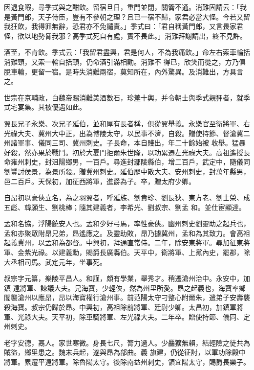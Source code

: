\begin{pinyinscope}
 因退食暇，尋季式與之酣飲。留宿旦日，重門並閉，關籥不通。消難固請云：「我是黃門郎，天子侍臣，豈有不參朝之理？且已一宿不歸，家君必當大怪。今若又留我狂飲，我得罪無辭，恐君亦不免譴責。」季式曰：「君自稱黃門郎，又言畏家君怪，欲以地勢脅我邪？高季式死自有處，實不畏此。」消難拜謝請出，終不見許。



 酒至，不肯飲。季式云：「我留君盡興，君是何人，不為我痛飲。」命左右索車輪括消難頸，又索一輪自括頸，仍命酒引滿相勸。消難不
 得已，欣笑而從之，方乃俱脫車輪，更留一宿。是時失消難兩宿，莫知所在，內外驚異。及消難出，方具言之。



 世宗在京輔政，白魏帝賜消難美酒數石，珍羞十輿，并令朝士與季式親狎者，就季式宅宴集。其被優遇如此。



 翼長兄子永樂、次兄子延伯，並和厚有長者稱，俱從翼舉義。永樂官至衛將軍、右光祿大夫、冀州大中正，出為博陵太守，以民事不濟，自殺。贈使持節、督滄冀二州諸軍事、儀同三司、冀州刺史。子長命，本自賤出，年二十餘始被
 收舉。猛暴好殺，然亦果於戰鬥。初於大夏門拒爾朱世隆，以功累遷左光祿大夫。高祖遙授長命雍州刺史，封沮陽鄉男，一百戶。尋進封鄢陵縣伯，增二百戶，武定中，隨儀同劉豐討侯景，為景所殺。贈冀州刺史。延伯歷中散大夫、安州刺史，封萬年縣男，邑二百戶。天保初，加征西將軍，進爵為子。卒，贈太府少卿。



 自昂初以豪俠立名，為之羽翼者，呼延族、劉貴珍、劉長狄、東方老、劉士榮、成五彪、韓願生、劉桃棒；隨其建義者，李希光、劉叔宗、劉孟
 和。並仕宦顯達。



 孟和名協，浮陽饒安人也。孟和少好弓馬，率性豪俠。幽州刺史劉靈助之起兵也，孟和亦聚眾附昂兄弟，昂遙應之。及靈助敗，昂乃據冀州，孟和為其致力。會高祖起義冀州，以孟和為都督。中興初，拜通直常侍。二年，除安東將軍。尋加征東將軍、金紫光祿。以建義勳，賜爵長廣縣伯。天平中，衛將軍、上黨內史，罷郡，除大丞相司馬。武定元年，坐事死。



 叔宗字元纂，樂陵平昌人。和謹，頗有學業，舉秀才。稍遷滄州治中。永安中，加鎮
 遠將軍、諫議大夫。兄海寶，少輕俠，然為州里所愛。昂之起義也，海寶率鄉閭襲滄州以應昂，昂以海寶權行滄州事。前范陽太守刁整心附爾朱，遣弟子安壽襲殺海寶。叔宗仍歸於昂。中興初，高祖除前將軍、廷尉少卿。太昌初，加鎮軍將軍、光祿大夫。天平初，除車騎將軍、左光祿大夫。二年卒。贈使持節、儀同、定州刺史。



 老字安德，鬲人。家世寒微。身長七尺，膂力過人。少麤獷無賴，結輕險之徒共為賊盜，鄉里患之。魏末兵起，遂與昂為部曲。義
 旗建，仍從征討，以軍功除殿中將軍。累遷平遠將軍。除魯陽太守。後除南益州刺史，領宜陽太守，賜爵長樂子。




\end{pinyinscope}
